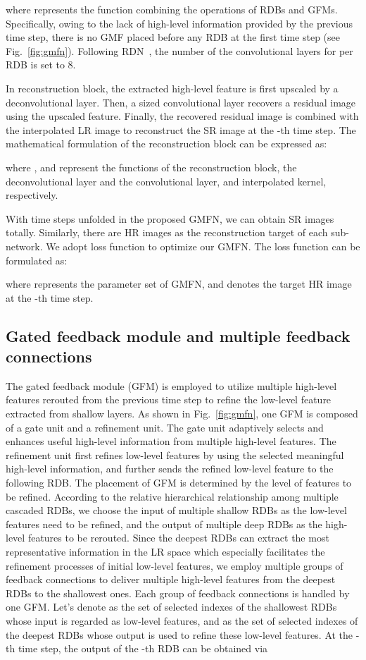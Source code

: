 \documentclass{bmvc2k}
\begin{document}
	where  represents the function combining the operations of  RDBs and  GFMs. Specifically, owing to the lack of high-level information provided by the previous time step, there is no GMF placed before any RDB at the first time step (see Fig.~\ref{fig:gmfn}). Following RDN~\cite{zhang2018residual}, the number of the convolutional layers for per RDB is set to 8. 
	
	In reconstruction block, the extracted high-level feature  is first upscaled by a deconvolutional layer. Then, a  sized convolutional layer recovers a residual image using the upscaled feature. Finally, the recovered residual image is combined with the interpolated LR image to reconstruct the SR image  at the -th time step. The mathematical formulation of the reconstruction block can be expressed as:
	
	where ,  and  represent the functions of the reconstruction block, the deconvolutional layer and the convolutional layer, and interpolated kernel, respectively. 
	
	With  time steps unfolded in the proposed GMFN, we can obtain  SR images totally. Similarly, there are  HR images as the reconstruction target of each sub-network. We adopt  loss function to optimize our GMFN. The loss function can be formulated as:
	
	where  represents the parameter set of GMFN, and  denotes the target HR image at the -th time step.
	
\subsection{Gated feedback module and multiple feedback connections}
\label{sec:gfm}
The gated feedback module (GFM) is employed to utilize multiple high-level features rerouted from the previous time step to refine the low-level feature extracted from shallow layers. As shown in Fig.~\ref{fig:gmfn}, one GFM is composed of a gate unit and a refinement unit. The gate unit adaptively selects and enhances useful high-level information from multiple high-level features. The refinement unit first refines low-level features by using the selected meaningful high-level information, and further sends the refined low-level feature to the following RDB.
The placement of GFM is determined by the level of features to be refined. According to the relative hierarchical relationship among multiple cascaded RDBs, we choose the input of multiple shallow RDBs as the low-level features need to be refined, and the output of multiple deep RDBs as the high-level features to be rerouted. Since the deepest RDBs can extract the most representative information in the LR space which especially facilitates the refinement processes of initial low-level features, we employ multiple groups of feedback connections to deliver multiple high-level features from the deepest RDBs to the shallowest ones. Each group of feedback connections is handled by one GFM. Let's denote  as the set of selected indexes of the shallowest  RDBs whose input is regarded as low-level features, and  as the set of selected indexes of the deepest  RDBs whose output is used to refine these low-level features. At the -th time step, the output of the -th RDB  can be obtained via
\end{document}
